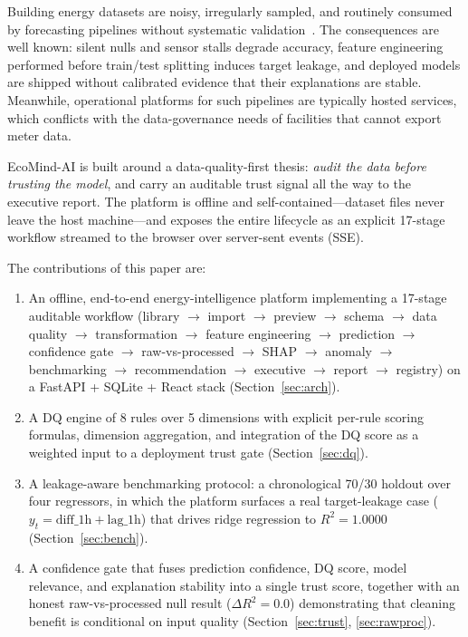 \documentclass[conference]{IEEEtran}
\begin{document}
Building energy datasets are noisy, irregularly sampled, and routinely consumed by forecasting pipelines without systematic validation~\cite{amasyali:2018, wang:1996}. The consequences are well known: silent nulls and sensor stalls degrade accuracy, feature engineering performed before train/test splitting induces target leakage, and deployed models are shipped without calibrated evidence that their explanations are stable. Meanwhile, operational platforms for such pipelines are typically hosted services, which conflicts with the data-governance needs of facilities that cannot export meter data.

EcoMind-AI is built around a data-quality-first thesis: \emph{audit the data before trusting the model}, and carry an auditable trust signal all the way to the executive report. The platform is offline and self-contained---dataset files never leave the host machine---and exposes the entire lifecycle as an explicit 17-stage workflow streamed to the browser over server-sent events (SSE).

The contributions of this paper are:
\begin{enumerate}
\item An offline, end-to-end energy-intelligence platform implementing a 17-stage auditable workflow (library $\rightarrow$ import $\rightarrow$ preview $\rightarrow$ schema $\rightarrow$ data quality $\rightarrow$ transformation $\rightarrow$ feature engineering $\rightarrow$ prediction $\rightarrow$ confidence gate $\rightarrow$ raw-vs-processed $\rightarrow$ SHAP $\rightarrow$ anomaly $\rightarrow$ benchmarking $\rightarrow$ recommendation $\rightarrow$ executive $\rightarrow$ report $\rightarrow$ registry) on a FastAPI + SQLite + React stack (Section~\ref{sec:arch}).
\item A DQ engine of 8 rules over 5 dimensions with explicit per-rule scoring formulas, dimension aggregation, and integration of the DQ score as a weighted input to a deployment trust gate (Section~\ref{sec:dq}).
\item A leakage-aware benchmarking protocol: a chronological 70/30 holdout over four regressors, in which the platform surfaces a real target-leakage case ($y_t = \text{diff\_1h} + \text{lag\_1h}$) that drives ridge regression to $R^2=1.0000$ (Section~\ref{sec:bench}).
\item A confidence gate that fuses prediction confidence, DQ score, model relevance, and explanation stability into a single trust score, together with an honest raw-vs-processed null result ($\Delta R^2 = 0.0$) demonstrating that cleaning benefit is conditional on input quality (Section~\ref{sec:trust}, \ref{sec:rawproc}).
\end{enumerate}
\end{document}
